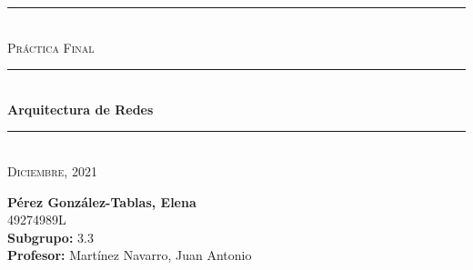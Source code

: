 \begin{titlepage}
	\begin{center}
		\rule{15cm}{0pt} \\
		[3cm]
		\textsc{\Large Práctica Final} \\
		\rule{15cm}{1pt} \\
		[0.25cm]
		\huge{\bfseries Arquitectura de Redes} \\
		\rule{15cm}{1pt} \\
		[0.25cm]
		\textsc{\Large Diciembre, 2021}\\
		[9cm]
	\end{center}
	\begin{flushright}
		\textbf{Pérez González-Tablas, Elena} \\
		[0.25cm]
		49274989L \\
		[0.25cm]
		\textbf{Subgrupo:} 3.3 \\
		[0.25cm]
		\textbf{Profesor:} Martínez Navarro, Juan Antonio\\
	\end{flushright}
\end{titlepage}
\newpage
\begin{titlepage}
	\begin{flushleft}
	\end{flushleft}
\end{titlepage}
